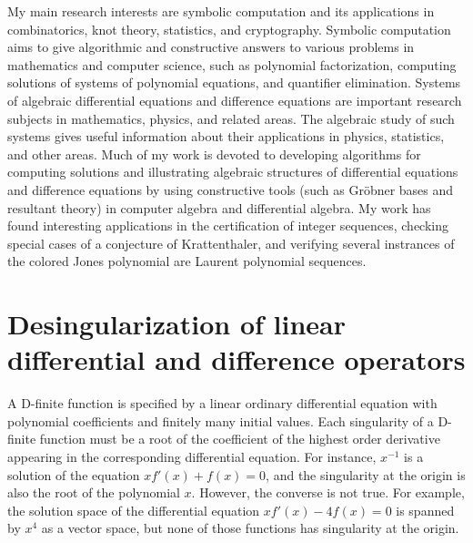 \documentclass[10pt,a4paper]{article}
\begin{document}
My main research interests are symbolic computation and its applications in combinatorics, knot theory, statistics, 
and cryptography.  Symbolic computation aims to give algorithmic and constructive answers 
to various problems in mathematics and computer science, such as polynomial factorization, computing solutions of systems of polynomial equations, 
and quantifier elimination. Systems of algebraic differential equations and difference equations are important research subjects in mathematics, physics, and related areas. 
The algebraic study of such systems gives useful information about their applications in physics, statistics, and other areas. 
Much of my work is devoted to developing algorithms for  computing solutions and illustrating algebraic structures of differential equations and difference equations
by using constructive tools (such as Gr\"obner bases and resultant theory) in computer algebra and differential algebra. 
My work has found interesting applications in the certification of integer sequences, checking special cases of a conjecture of Krattenthaler, and verifying 
several instrances of the colored Jones polynomial are Laurent polynomial sequences.  

\nopagebreak 
\section*{Desingularization of linear differential and difference operators}

A D-finite function is specified by a linear ordinary differential equation with polynomial 
coefficients and finitely many initial values. Each singularity of a D-finite function 
must be a root of the coefficient of the highest order derivative appearing 
in the corresponding differential equation. 
For instance, $x^{-1}$ is a solution of the equation $x f'(x) + f(x) = 0$, 
and the singularity at the origin is also the root of the polynomial $x$. 
However, the converse is not true. For example, the solution space of 
the differential equation $x f'(x) - 4 f(x) = 0$ is spanned by $x^4$ as a vector space, 
but none of those functions has singularity at the origin. 
\end{document}
